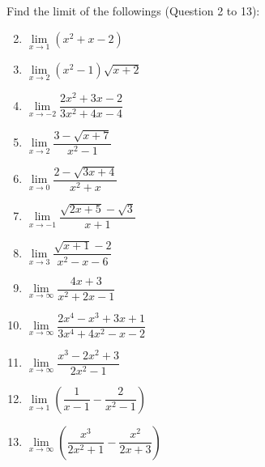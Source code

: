\documentclass[12pt]{report}
\begin{document}
\setlength{\columnseprule}{1pt}
\setlength{\columnsep}{24pt}
\begin{multicols}{2}
  \noindent Find the limit of the followings (Question 2 to 13):
  \begin{enumerate}
    \setcounter{enumi}{1}
    \item $\lim\limits_{x\to1}\left(x^{2}+x-2\right)$
    \item $\lim\limits_{x\to2}\left(x^{2}-1\right){\sqrt{x+2}}$
    \item $\lim\limits_{x\to-2}{\dfrac{2x^{2}+3x-2}{3x^{2}+4x-4}}$
    \item $\lim\limits_{x\to2}{\dfrac{3-{\sqrt{x+7}}}{x^{2}-1}}$
    \item $\lim\limits_{x\to0}{\dfrac{2-{\sqrt{3x+4}}}{x^{2}+x}}$
    \item $\lim\limits_{x\to-1}{\dfrac{{\sqrt{2x+5}}-{\sqrt{3}}}{x+1}}$
    \item $\lim\limits_{x\to3}{\dfrac{{\sqrt{x+1}}-2}{x^{2}-x-6}}$
    \item $\lim\limits_{x\to\infty}{\dfrac{4x+3}{x^{2}+2x-1}}$
    \item $\lim\limits_{x\to\infty}{\dfrac{2x^{4}-x^{3}+3x+1}{3x^{4}+4x^{2}-x-2}}$
    \item $\lim\limits_{x\to\infty}{\dfrac{x^{3}-2x^{2}+3}{2x^{2}-1}}$
    \item $\lim\limits_{x\to1}\left({\dfrac{1}{x-1}}-{\dfrac{2}{x^{2}-1}}\right)$
    \item $\lim\limits_{x\to\infty}\left(\dfrac{x^{3}}{2x^{2}+1}-\dfrac{x^{2}}{2x+3}\right)$
  \end{enumerate}


\end{multicols}
\end{document}
